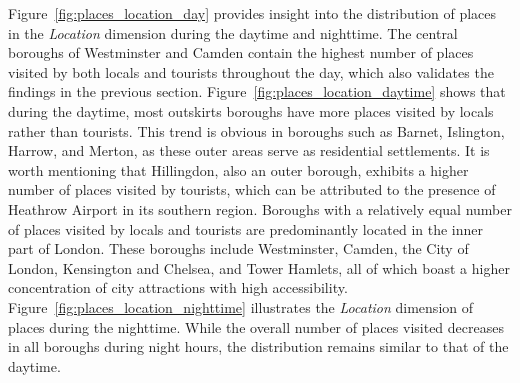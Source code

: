 \documentclass{article}
\theoremstyle{remark}
\begin{document}
Figure~\ref{fig:places_location_day} provides insight into the distribution of places in the \textit{Location} dimension during the daytime and nighttime. The central boroughs of Westminster and Camden contain the highest number of places visited by both locals and tourists throughout the day, which also validates the findings in the previous section. Figure~\ref{fig:places_location_daytime} shows that during the daytime, most outskirts boroughs have more places visited by locals rather than tourists. This trend is obvious in boroughs such as Barnet, Islington, Harrow, and Merton, as these outer areas serve as residential settlements. It is worth mentioning that Hillingdon, also an outer borough, exhibits a higher number of places visited by tourists, which can be attributed to the presence of Heathrow Airport in its southern region. Boroughs with a relatively equal number of places visited by locals and tourists are predominantly located in the inner part of London. These boroughs include Westminster, Camden, the City of London, Kensington and Chelsea, and Tower Hamlets, all of which boast a higher concentration of city attractions with high accessibility. Figure~\ref{fig:places_location_nighttime} illustrates the \textit{Location} dimension of places during the nighttime. While the overall number of places visited decreases in all boroughs during night hours, the distribution remains similar to that of the daytime.
\end{document}
